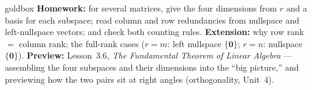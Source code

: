 \documentclass[10pt]{article}
\newcommand{\zero}{\mathbf{0}}
\begin{document}
\begin{skillbox}{goldbox}
\textbf{Homework:} for several matrices, give the four dimensions from $r$ and a basis for each subspace;
read column and row redundancies from nullspace and left-nullspace vectors; and check both counting rules.
\textbf{Extension:} why row rank $=$ column rank; the full-rank cases ($r=m$: left nullspace $\{\zero\}$;
$r=n$: nullspace $\{\zero\}$). \textbf{Preview:} Lesson~3.6, \emph{The Fundamental Theorem of Linear
Algebra} --- assembling the four subspaces and their dimensions into the ``big picture,'' and previewing how
the two pairs sit at right angles (orthogonality, Unit~4).
\end{skillbox}
\end{document}
